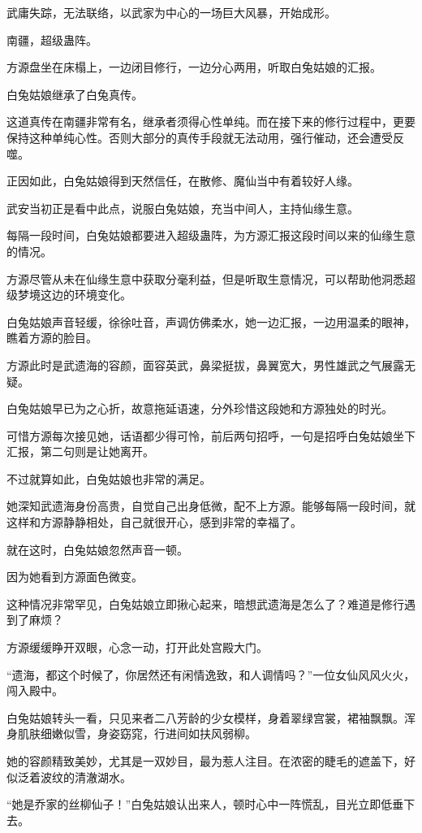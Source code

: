 \begin{this_body}
武庸失踪，无法联络，以武家为中心的一场巨大风暴，开始成形。

南疆，超级蛊阵。

方源盘坐在床榻上，一边闭目修行，一边分心两用，听取白兔姑娘的汇报。

白兔姑娘继承了白兔真传。

这道真传在南疆非常有名，继承者须得心性单纯。而在接下来的修行过程中，更要保持这种单纯心性。否则大部分的真传手段就无法动用，强行催动，还会遭受反噬。

正因如此，白兔姑娘得到天然信任，在散修、魔仙当中有着较好人缘。

武安当初正是看中此点，说服白兔姑娘，充当中间人，主持仙缘生意。

每隔一段时间，白兔姑娘都要进入超级蛊阵，为方源汇报这段时间以来的仙缘生意的情况。

方源尽管从未在仙缘生意中获取分毫利益，但是听取生意情况，可以帮助他洞悉超级梦境这边的环境变化。

白兔姑娘声音轻缓，徐徐吐音，声调仿佛柔水，她一边汇报，一边用温柔的眼神，瞧着方源的脸目。

方源此时是武遗海的容颜，面容英武，鼻梁挺拔，鼻翼宽大，男性雄武之气展露无疑。

白兔姑娘早已为之心折，故意拖延语速，分外珍惜这段她和方源独处的时光。

可惜方源每次接见她，话语都少得可怜，前后两句招呼，一句是招呼白兔姑娘坐下汇报，第二句则是让她离开。

不过就算如此，白兔姑娘也非常的满足。

她深知武遗海身份高贵，自觉自己出身低微，配不上方源。能够每隔一段时间，就这样和方源静静相处，自己就很开心，感到非常的幸福了。

就在这时，白兔姑娘忽然声音一顿。

因为她看到方源面色微变。

这种情况非常罕见，白兔姑娘立即揪心起来，暗想武遗海是怎么了？难道是修行遇到了麻烦？

方源缓缓睁开双眼，心念一动，打开此处宫殿大门。

“遗海，都这个时候了，你居然还有闲情逸致，和人调情吗？”一位女仙风风火火，闯入殿中。

白兔姑娘转头一看，只见来者二八芳龄的少女模样，身着翠绿宫裳，裙袖飘飘。浑身肌肤细嫩似雪，身姿窈窕，行进间如扶风弱柳。

她的容颜精致美妙，尤其是一双妙目，最为惹人注目。在浓密的睫毛的遮盖下，好似泛着波纹的清澈湖水。

“她是乔家的丝柳仙子！”白兔姑娘认出来人，顿时心中一阵慌乱，目光立即低垂下去。


\end{this_body}

